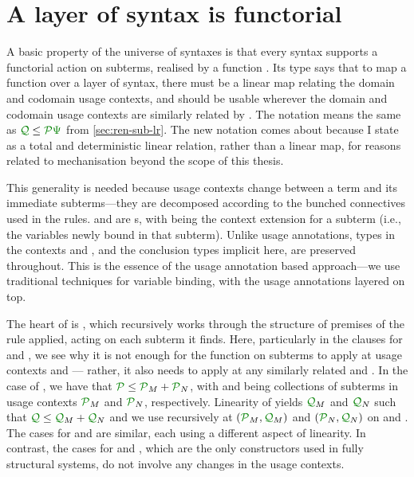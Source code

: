 \section{A layer of syntax is functorial}\label{sec:functorial}

A basic property of the universe of syntaxes
is that every syntax supports a functorial action on subterms, realised by a
function .
Its type says that to map a function 
over a layer of syntax, there must be a linear map \AgdaBound{$\Psi$} relating the
domain and codomain usage contexts, and  should be usable
wherever the domain and codomain usage contexts are similarly related by
\AgdaBound{$\Psi$}.
The notation
\AgdaBound{$\Psi$}\AgdaSpace{}\AgdaSpace{}%
\AgdaSpace{}
means the same as $\grQ \leq \grP\gr\Psi$ from \cref{sec:ren-sub-lr}.
The new notation comes about because I state \AgdaBound{$\Psi$} as a total and
deterministic linear relation, rather than a linear map, for reasons related to
mechanisation beyond the scope of this thesis.


This generality is needed because usage contexts change between
a term and its immediate subterms---they are decomposed according to the bunched connectives used in the rules.
 and  are s, with
\AgdaBound{$\Theta$} being the context extension for a subterm (i.e., the
variables newly bound in that subterm).
Unlike usage annotations, types in the contexts \AgdaBound{$\gamma$} and \AgdaBound{$\delta$}, and the conclusion types implicit here, are preserved throughout.
This is the essence of the usage annotation based approach---we use traditional techniques for variable binding, with the usage annotations layered on top.

The heart of  is , which recursively
works through the structure  of premises of the rule applied,
acting on each subterm it finds.
Here, particularly in the clauses for  and
, we see why it is not enough for the
function on subterms to apply at usage contexts  and 
--- rather, it also needs to apply at any similarly related 
and .
In the case of , we have that
$\grP \leq \grP_M + \grP_N$, with  and  being
collections of subterms in usage contexts $\grP_M$ and $\grP_N$, respectively.
Linearity of \AgdaBound{$\Psi$} yields $\grQ_M$ and $\grQ_N$ such that
$\grQ \leq \grQ_M + \grQ_N$ and we use  recursively at
$(\grP_M, \grQ_M)$ and $(\grP_N, \grQ_N)$ on  and .
The cases for  and
 are similar, each using a different aspect
of linearity.
In contrast, the cases for  and
, which are the only constructors used in fully structural
systems, do not involve any changes in the usage contexts.

